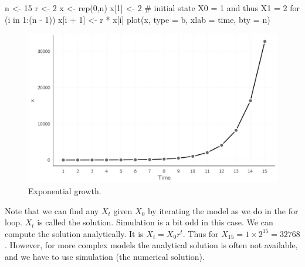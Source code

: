 \documentclass[
  a4paper,
  DIV=11,
  numbers=noendperiod,
  oneside]{scrreprt}
\newenvironment{Shaded}{\begin{snugshade}}{\end{snugshade}}
\newcommand{\AttributeTok}[1]{\textcolor[rgb]{0.40,0.45,0.13}{#1}}
\newcommand{\CommentTok}[1]{\textcolor[rgb]{0.37,0.37,0.37}{#1}}
\newcommand{\ControlFlowTok}[1]{\textcolor[rgb]{0.00,0.23,0.31}{#1}}
\newcommand{\DecValTok}[1]{\textcolor[rgb]{0.68,0.00,0.00}{#1}}
\newcommand{\FunctionTok}[1]{\textcolor[rgb]{0.28,0.35,0.67}{#1}}
\newcommand{\NormalTok}[1]{\textcolor[rgb]{0.00,0.23,0.31}{#1}}
\newcommand{\OtherTok}[1]{\textcolor[rgb]{0.00,0.23,0.31}{#1}}
\newcommand{\SpecialCharTok}[1]{\textcolor[rgb]{0.37,0.37,0.37}{#1}}
\newcommand{\StringTok}[1]{\textcolor[rgb]{0.13,0.47,0.30}{#1}}
\begin{document}
\begin{Shaded}
\begin{Highlighting}[]
\NormalTok{n }\OtherTok{\textless{}{-}} \DecValTok{15}
\NormalTok{r }\OtherTok{\textless{}{-}} \DecValTok{2}
\NormalTok{x }\OtherTok{\textless{}{-}} \FunctionTok{rep}\NormalTok{(}\DecValTok{0}\NormalTok{,n)}
\NormalTok{x[}\DecValTok{1}\NormalTok{] }\OtherTok{\textless{}{-}} \DecValTok{2} \CommentTok{\# initial state X0 = 1 and thus X1 = 2}
\ControlFlowTok{for}\NormalTok{ (i }\ControlFlowTok{in} \DecValTok{1}\SpecialCharTok{:}\NormalTok{(n }\SpecialCharTok{{-}} \DecValTok{1}\NormalTok{))}
\NormalTok{  x[i }\SpecialCharTok{+} \DecValTok{1}\NormalTok{] }\OtherTok{\textless{}{-}}\NormalTok{ r }\SpecialCharTok{*}\NormalTok{ x[i]}
\FunctionTok{plot}\NormalTok{(x, }\AttributeTok{type =} \StringTok{\textquotesingle{}b\textquotesingle{}}\NormalTok{, }\AttributeTok{xlab =} \StringTok{\textquotesingle{}time\textquotesingle{}}\NormalTok{, }\AttributeTok{bty =} \StringTok{\textquotesingle{}n\textquotesingle{}}\NormalTok{)}
\end{Highlighting}
\end{Shaded}

\begin{figure}

{\centering \includegraphics{media/ch2/fig-ch2-img1.jpg}

}

\caption{\label{fig-ch2-img1}Exponential growth.}

\end{figure}

Note that we can find any \(X_{t}\) given \(X_{0}\) by iterating the
model as we do in the for loop. \(X_{t}\) is called the solution.
Simulation is a bit odd in this case. We can compute the solution
analytically. It is \(X_{t} = X_{0}r^{t}\). Thus for
\(X_{15} = 1 \times 2^{15} = 32768\). However, for more complex models
the analytical solution is often not available, and we have to use
simulation (the numerical solution).
\end{document}
